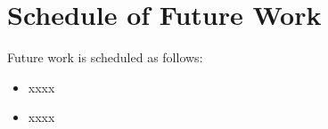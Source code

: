 \section{Schedule of Future Work}
\label{sec:Schedule}

Future work is scheduled as follows:
\begin{itemize}
  \item xxxx
  \item xxxx
\end{itemize}



